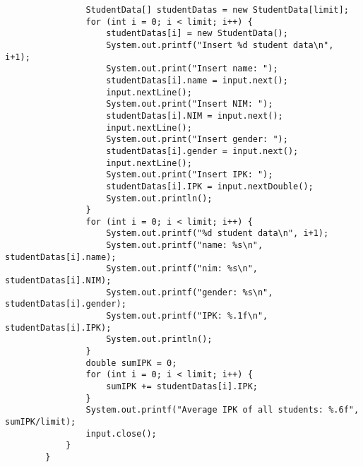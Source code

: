 \documentclass[12pt,titlepage]{article}
\begin{document}
\begin{enumerate}
\begin{verbatim}
                StudentData[] studentDatas = new StudentData[limit];
                for (int i = 0; i < limit; i++) {
                    studentDatas[i] = new StudentData();
                    System.out.printf("Insert %d student data\n", i+1);
                    System.out.print("Insert name: ");
                    studentDatas[i].name = input.next();
                    input.nextLine();
                    System.out.print("Insert NIM: ");
                    studentDatas[i].NIM = input.next();
                    input.nextLine();
                    System.out.print("Insert gender: ");
                    studentDatas[i].gender = input.next();
                    input.nextLine();
                    System.out.print("Insert IPK: ");
                    studentDatas[i].IPK = input.nextDouble();
                    System.out.println();
                }
                for (int i = 0; i < limit; i++) {
                    System.out.printf("%d student data\n", i+1);
                    System.out.printf("name: %s\n", studentDatas[i].name);
                    System.out.printf("nim: %s\n", studentDatas[i].NIM);
                    System.out.printf("gender: %s\n", studentDatas[i].gender);
                    System.out.printf("IPK: %.1f\n", studentDatas[i].IPK);
                    System.out.println();
                }
                double sumIPK = 0;
                for (int i = 0; i < limit; i++) {
                    sumIPK += studentDatas[i].IPK;
                }
                System.out.printf("Average IPK of all students: %.6f", sumIPK/limit);
                input.close();
            }
        }
    \end{verbatim}
\end{enumerate}
\end{document}
